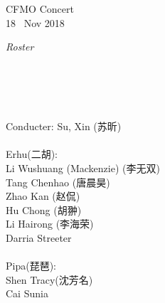 \documentclass[letter,6pt,poets]{ConcProg}
\begin{document}
\begin{spacing}{1.1}
\begin{programme}{
    CFMO Concert
\\  {\normalsize 18 ~Nov 2018}
}
\begin{part}[]
%

  \end{part}
  
  
\end{programme}
\begin{center}
\Large\textsl{ Roster}
\end{center}

\begin{multicols}{2}%

\\
\\
\\

\\
Conducter: Su, Xin  (苏昕)
\\
\\
 Erhu(二胡):                 \\
Li Wushuang (Mackenzie) (李无双)   \\
Tang Chenhao  (唐晨昊) \\
Zhao Kan (赵侃)\\
Hu Chong (胡翀)\\
Li Hairong (李海荣)\\
Darria Streeter\\
\\
Pipa(琵琶):\\
Shen Tracy(沈芳名)\\
Cai Sunia\\


\end{multicols}
\end{spacing}
\end{document}
